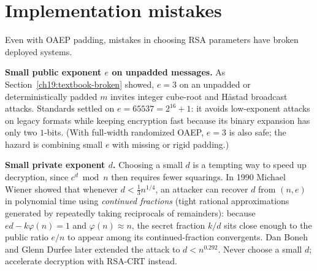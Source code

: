 \section{Implementation mistakes}
\label{ch19:mistakes}

Even with OAEP padding, mistakes in choosing RSA parameters have broken deployed systems.

\begin{attackbox}
\textbf{Small public exponent $e$ on unpadded messages.} As Section~\ref{ch19:textbook-broken} showed, $e=3$ on an unpadded or deterministically padded $m$ invites integer cube-root and H\r{a}stad broadcast attacks. Standards settled on $e = 65537 = 2^{16}+1$: it avoids low-exponent attacks on legacy formats while keeping encryption fast because its binary expansion has only two $1$-bits. (With full-width randomized OAEP, $e=3$ is also safe; the hazard is combining small $e$ with missing or rigid padding.)
\end{attackbox}

\begin{attackbox}
\textbf{Small private exponent $d$.} Choosing a small $d$ is a tempting way to speed up decryption, since $c^d \bmod n$ then requires fewer squarings. In 1990 Michael Wiener showed that whenever $d < \tfrac{1}{3} n^{1/4}$, an attacker can recover $d$ from $(n,e)$ in polynomial time using \emph{continued fractions} (tight rational approximations generated by repeatedly taking reciprocals of remainders): because $ed - k\varphi(n) = 1$ and $\varphi(n) \approx n$, the secret fraction $k/d$ sits close enough to the public ratio $e/n$ to appear among its continued-fraction convergents. Dan Boneh and Glenn Durfee later extended the attack to $d < n^{0.292}$. Never choose a small $d$; accelerate decryption with RSA-CRT instead.
\end{attackbox}


